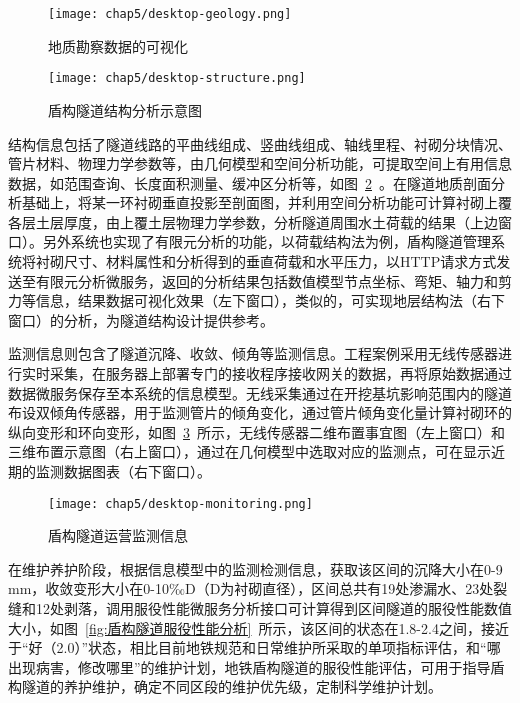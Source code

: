\begin{figure}[htb!]
    \centering
    \texttt{[image: chap5/desktop-geology.png]}
    \caption{地质勘察数据的可视化}
    \label{fig:地质勘察数据的可视化}
\end{figure}

\begin{figure}[htb!]
    \centering
    \texttt{[image: chap5/desktop-structure.png]}
    \caption{盾构隧道结构分析示意图}
    \label{fig:盾构隧道结构分析示意图}
\end{figure}

结构信息包括了隧道线路的平曲线组成、竖曲线组成、轴线里程、衬砌分块情况、管片材料、物理力学参数等，由几何模型和空间分析功能，可提取空间上有用信息数据，如范围查询、长度面积测量、缓冲区分析等，如图~\ref{fig:盾构隧道结构分析示意图}~。在隧道地质剖面分析基础上，将某一环衬砌垂直投影至剖面图，并利用空间分析功能可计算衬砌上覆各层土层厚度，由上覆土层物理力学参数，分析隧道周围水土荷载的结果（上边窗口）。另外系统也实现了有限元分析的功能，以荷载结构法为例，盾构隧道管理系统将衬砌尺寸、材料属性和分析得到的垂直荷载和水平压力，以HTTP请求方式发送至有限元分析微服务，返回的分析结果包括数值模型节点坐标、弯矩、轴力和剪力等信息，结果数据可视化效果（左下窗口），类似的，可实现地层结构法（右下窗口）的分析，为隧道结构设计提供参考。

监测信息则包含了隧道沉降、收敛、倾角等监测信息。工程案例采用无线传感器进行实时采集，在服务器上部署专门的接收程序接收网关的数据，再将原始数据通过数据微服务保存至本系统的信息模型。无线采集通过在开挖基坑影响范围内的隧道布设双倾角传感器，用于监测管片的倾角变化，通过管片倾角变化量计算衬砌环的纵向变形和环向变形，如图~\ref{fig:盾构隧道运营监测信息}~所示，无线传感器二维布置事宜图（左上窗口）和三维布置示意图（右上窗口），通过在几何模型中选取对应的监测点，可在显示近期的监测数据图表（右下窗口）。

\begin{figure}[htb!]
    \centering
    \texttt{[image: chap5/desktop-monitoring.png]}
    \caption{盾构隧道运营监测信息}
    \label{fig:盾构隧道运营监测信息}
\end{figure}

在维护养护阶段，根据信息模型中的监测检测信息，获取该区间的沉降大小在0-9 mm，收敛变形大小在0-10‰D（D为衬砌直径），区间总共有19处渗漏水、23处裂缝和12处剥落，调用服役性能微服务分析接口可计算得到区间隧道的服役性能数值大小，如图~\ref{fig:盾构隧道服役性能分析}~所示，该区间的状态在1.8-2.4之间，接近于“好（2.0）”状态，相比目前地铁规范和日常维护所采取的单项指标评估，和“哪出现病害，修改哪里”的维护计划，地铁盾构隧道的服役性能评估，可用于指导盾构隧道的养护维护，确定不同区段的维护优先级，定制科学维护计划。

